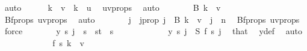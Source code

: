 \begin{isabellebody}
\ auto\isanewline
\ \ \ \ \isamarkupfalse%
\ {\isachardoublequoteopen}k\ {\isacharminus}{\kern0pt}\ v\ {\isacharless}{\kern0pt}\ k\ {\isacharminus}{\kern0pt}\ u{\isachardoublequoteclose}\ \isamarkupfalse%
\ uv{\isacharunderscore}{\kern0pt}props\ \isamarkupfalse%
\ auto\isanewline
\ \ \ \ \isamarkupfalse%
\ \isamarkupfalse%
\ {\isachardoublequoteopen}B\ {\isacharparenleft}{\kern0pt}k\ {\isacharminus}{\kern0pt}\ v{\isacharparenright}{\kern0pt}\ {\isasymnoteq}\ {\isacharbraceleft}{\kern0pt}{\isacharbraceright}{\kern0pt}{\isachardoublequoteclose}\ \isamarkupfalse%
\ Bf{\isacharunderscore}{\kern0pt}props{\isacharparenleft}{\kern0pt}{}{\isacharparenright}{\kern0pt}\ uv{\isacharunderscore}{\kern0pt}props\ \isamarkupfalse%
\ auto\isanewline
\ \ \ \ \isamarkupfalse%
\ \isamarkupfalse%
\ j\ \ j{\isacharunderscore}{\kern0pt}prop{\isacharcolon}{\kern0pt}\ {\isachardoublequoteopen}j\ {\isasymin}\ B\ {\isacharparenleft}{\kern0pt}k\ {\isacharminus}{\kern0pt}\ v{\isacharparenright}{\kern0pt}\ {\isasymand}\ j\ {\isacharless}{\kern0pt}\ n{\isachardoublequoteclose}\ \isamarkupfalse%
\ Bf{\isacharunderscore}{\kern0pt}props{\isacharparenleft}{\kern0pt}{}{\isacharparenright}{\kern0pt}\ uv{\isacharunderscore}{\kern0pt}props\ \isamarkupfalse%
\ force\isanewline
\ \ \ \ \isamarkupfalse%
\ \isamarkupfalse%
\ {\isachardoublequoteopen}y\ s\ j\ {\isacharequal}{\kern0pt}\ s{\isachardoublequoteclose}\ \ {\isachardoublequoteopen}s{\isacharless}{\kern0pt}t{\isacharplus}{\kern0pt}{}{\isachardoublequoteclose}\ \ s\isanewline
\ \ \ \ \isamarkupfalse%
\isanewline
\ \ \ \ \ \ \isamarkupfalse%
\ {\isachardoublequoteopen}y\ s\ j\ {\isacharequal}{\kern0pt}\ S\ {\isacharparenleft}{\kern0pt}{\isacharquery}{\kern0pt}f\ s{\isacharparenright}{\kern0pt}\ j{\isachardoublequoteclose}\ \isamarkupfalse%
\ that\ \isamarkupfalse%
\ y{\isacharunderscore}{\kern0pt}def\ \isamarkupfalse%
\ auto\isanewline
\ \ \ \ \ \ \isamarkupfalse%
\ \isamarkupfalse%
\ {\isachardoublequoteopen}\ {\isachardot}{\kern0pt}{\isachardot}{\kern0pt}{\isachardot}{\kern0pt}\ {\isacharequal}{\kern0pt}\ {\isacharparenleft}{\kern0pt}{\isacharquery}{\kern0pt}f\ s{\isacharparenright}{\kern0pt}\ {\isacharparenleft}{\kern0pt}k\ {\isacharminus}{\kern0pt}\ v{\isacharparenright}{\kern0pt}{\isachardoublequoteclose}\ \isamarkupfalse%

\end{isabellebody}
